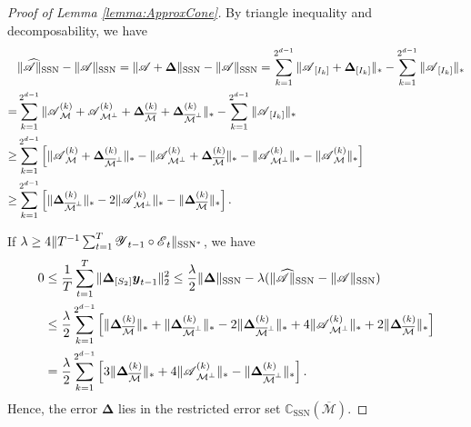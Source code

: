 \documentclass[12pt]{article}
\newcommand{\bm}{\boldsymbol}
\newcommand{\cm}[1]{\mbox{\boldmath$\mathscr{#1}$}}
\begin{document}
\begin{proof}[Proof of Lemma \ref{lemma:ApproxCone}]
	By triangle inequality and decomposability, we have
	\begin{equation}\begin{split}
	&\|\cm{\widehat{A}}\|_{\text{SSN}}-\|\cm{A}\|_{\text{SSN}}=\|\cm{A}+\bm{\Delta}\|_{\text{SSN}}-\|\cm{A}\|_{\text{SSN}}=\sum_{k=1}^{2^{d-1}}\|\cm{A}_{[I_k]}+\bm{\Delta}_{[I_k]}\|_{*}-\sum_{k=1}^{2^{d-1}}\|\cm{A}_{[I_k]}\|_{*}\\
	=&\sum_{k=1}^{2^{d-1}}\|\cm{A}_{\mathcal{M}}^{(k)}+\cm{A}_{\mathcal{M}^\perp}^{(k)}+\bm{\Delta}_{\overline{\mathcal{M}}}^{(k)}+\bm{\Delta}_{\overline{\mathcal{M}}^\perp}^{(k)}\|_{*}-\sum_{k=1}^{2^{d-1}}\|\cm{A}_{[I_k]}\|_{*}\\
	\geq&\sum_{k=1}^{2^{d-1}}\left[\|\cm{A}_{\mathcal{M}}^{(k)}+\bm{\Delta}_{\overline{\mathcal{M}}^\perp}^{(k)}\|_{*}-\|\cm{A}_{\mathcal{M}^\perp}^{(k)}+\bm{\Delta}_{\overline{\mathcal{M}}}^{(k)}\|_{*}-\|\cm{A}^{(k)}_{\mathcal{M}^\perp}\|_{*}-\|\cm{A}^{(k)}_{\mathcal{M}}\|_{*}\right]\\
	\geq&\sum_{k=1}^{2^{d-1}}\left[\|\bm{\Delta}_{\overline{\mathcal{M}}^\perp}^{(k)}\|_{*}-2\|\cm{A}_{\mathcal{M}^\perp}^{(k)}\|_{*}-\|\bm{\Delta}_{\overline{\mathcal{M}}}^{(k)}\|_{*}\right].
	\end{split}\end{equation}
	
	If $\lambda\geq 4\|T^{-1}\sum_{t=1}^T\cm{Y}_{t-1}\circ\cm{E}_t\|_{\text{SSN}^*}$, we have
	\begin{equation}\begin{split}
	0&\leq\frac{1}{T}\sum_{t=1}^T\|\bm{\Delta}_{[S_2]}\bm{y}_{t-1}\|_2^2
	\leq\frac{\lambda}{2}\|\bm{\Delta}\|_{\text{SSN}}-\lambda(\|\cm{\widehat{A}}\|_{\text{SSN}}-\|\cm{A}\|_{\text{SSN}})\\
	&\leq\frac{\lambda}{2}\sum_{k=1}^{2^{d-1}}\left[\|\bm{\Delta}^{(k)}_{\overline{\mathcal{M}}}\|_{*}+\|\bm{\Delta}^{(k)}_{\overline{\mathcal{M}}^\perp}\|_{*}-2\|\bm{\Delta}^{(k)}_{\overline{\mathcal{M}}^\perp}\|_{*}+4\|\cm{A}^{(k)}_{\mathcal{M}^\perp}\|_{*}+2\|\bm{\Delta}_{\overline{\mathcal{M}}}^{(k)}\|_{*}\right]\\
	&=\frac{\lambda}{2}\sum_{k=1}^{2^{d-1}}\left[3\|\bm{\Delta}_{\overline{\mathcal{M}}}^{(k)}\|_{*}+4\|\cm{A}^{(k)}_{\mathcal{M}^\perp}\|_{*}-\|\bm{\Delta}^{(k)}_{\overline{\mathcal{M}}^\perp}\|_{*}\right].
	\end{split}\end{equation}
	Hence, the error $\bm{\Delta}$ lies in the restricted error set $\mathbb{C}_{\text{SSN}}(\overline{\mathcal{M}})$.
\end{proof}
\end{document}
